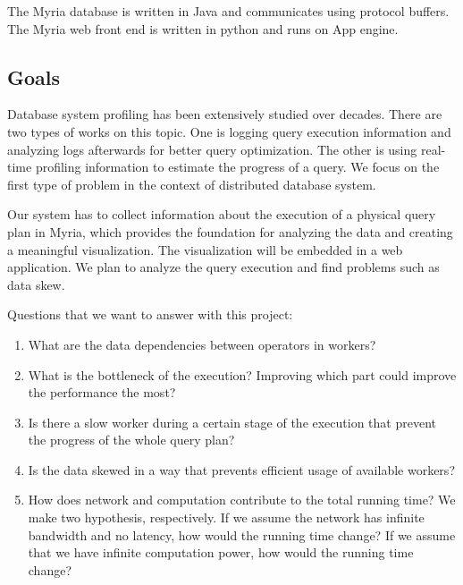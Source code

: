 \documentclass[11pt]{scrartcl}
\begin{document}
The Myria database is written in Java and communicates using protocol buffers. The Myria web front end is written in python and runs on App engine.


\subsection{Goals}
\label{sec:objective}

Database system profiling has been extensively studied over decades. There are two types of works on this topic. One is logging query execution information and analyzing logs afterwards for better query optimization. The other is using real-time profiling information to estimate the progress of a query. We focus on the first type of problem in the context of distributed database system.

Our system has to collect information about the execution of a physical query plan in Myria, which provides the foundation for analyzing the data and creating a meaningful visualization. The visualization will be embedded in a web application. We plan to analyze the query execution and find problems such as data skew.

\vspace{5px}

\noindent Questions that we want to answer with this project:

\begin{enumerate}
  \item What are the data dependencies between operators in workers?
  \item What is the bottleneck of the execution? Improving which part could improve the performance the most?
  \item Is there a slow worker during a certain stage of the execution that prevent the progress of the whole query plan?
  \item Is the data skewed in a way that prevents efficient usage of available workers?
  \item How does network and computation contribute to the total running time? We make two hypothesis, respectively. If we assume the network has infinite bandwidth and no latency, how would the running time change? If we assume that we have infinite computation power, how would the running time change?

\end{enumerate}
\end{document}
